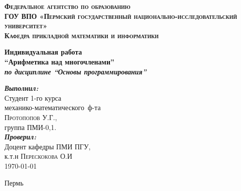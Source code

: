 \begin{titlepage}
\begin{center}


\textsc{\large \bf Федеральное агентство по образованию\\
ГОУ ВПО «Пермский государственный национально-исследовательский университет»\\
Кафедра прикладной математики и информатики}\\[1.5cm]

\vfill

{ \Large \bfseries Индивидуальная работа \\
``Арифметика над многочленами''\\
\em по дисциплине ``Основы программирования'' \\[0.4cm] }

\begin{flushright}
\begin{minipage}{0.5 \textwidth}
\begin{flushleft} \large
\emph{\bf Выполнил:} \\
Студент 1-го курса \\
механико-математического~ф-та \\
\textsc{Протопопов У.Г.},\\
группа ПМИ-0,1.\\
\emph{\bf Проверил:} \\
Доцент кафедры ПМИ ПГУ,\\
к.т.н {\underline{\hspace{50 pt}}} \textsc{Перескокова О.И}\\
\today
\end{flushleft}
\end{minipage}
\end{flushright}

\vfill

Пермь \the\year

\end{center}
\end{titlepage}

